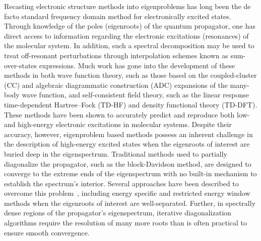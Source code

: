 Recasting electronic structure methods into eigenproblems has long been the de facto standard frequency domain method for electronically excited states. Through knowledge of the poles (eigenroots) of the quantum propagator, one has direct access to information regarding the electronic excitations (resonances) of the molecular system. In addition, such a spectral decomposition may be used to treat off-resonant perturbations through interpolation schemes known as sum-over-states expressions\cite{Yeager84_33}.
Much work has gone into the development of these methods in both wave function theory, such as those based on
the 
coupled-cluster (CC)\cite{olje1988,Monkhorst77_421,Jorgensen90_3333,Bartlett93_7029,Bartlett93_414} 
and algebraic diagrammatic construction (ADC)\cite{Dreuw14_4583,Dreuw14_1900} 
expansions of the many-body wave function,
and self-consistent field theory, such as the linear response time-dependent Hartree--Fock (TD-HF)\cite{Hattig98_1,Ring_book,Jorgensen_book,Rowe68_153} and density functional theory
(TD-DFT)\cite{Casida95_book,HeadGordon05_4009}. These methods have been shown to accurately predict and reproduce both low-\cite{Ruud12_543,Bartlett09_Book} and high-energy\cite{Li11_3540,Li15_2994,Li15_4146,DeSimone03_115,Neese07_2783,Asmuruf10_12024,Govind12_3284} electronic excitations in molecular systems.  Despite
their accuracy, however, eigenproblem based methods possess an inherent challenge in the
description of high-energy excited states when the eigenroots of interest
are buried deep in the eigenspectrum.  Traditional methods used to partially
diagonalize the propagator, such as the
block-Davidson method\cite{Davidson75_87,Scott86_817,Morgan92_287}, are designed to converge to the extreme ends of the
eigenspectrum with no built-in mechanism to establish the spectrum's interior. 
Several approaches have been described to overcome this problem~\cite{zuev_etal2015}, including
energy specific\cite{Li11_3540,Li15_4146} and
restricted energy window methods\cite{DeSimone03_115,Neese07_2783,Asmuruf10_12024} when the eigenroots of interest are well-separated. Further, in spectrally dense regions of the propagator's eigenspectrum, iterative diagonalization algorithms require the resolution of many more roots than is often practical to ensure smooth convergence.

